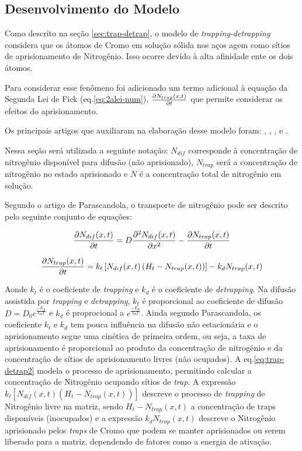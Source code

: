 \subsection{Desenvolvimento do Modelo}
\label{sec:trap-detrap-desenvolvimento}
Como descrito na seção \autoref{sec:trap-detrap}, o modelo de \textit{trapping-detrapping} considera que os átomos de Cromo em solução sólida nos aços agem como sítios de aprisionamento de Nitrogênio. Isso ocorre devido à alta afinidade ente os dois átomos.

Para considerar esse fenômeno foi adicionado um termo adicional à equação da Segunda Lei de Fick (eq.\autoref{eq:2alei-num}), $\pdv{N_{trap}(x,t)}{t}$ que permite considerar os efeitos do aprisionamento. 

Os principais artigos que auxiliaram na elaboração desse modelo foram:
\cite{moskalioviene2011modeling}, \cite{parascandola2000nitrogen}, \cite{moller1983pidat}, \cite{peng2018numerical} e \cite{moller2001surface}.  

Nessa seção será utilizada a seguinte notação: $N_{dif}$ corresponde à concentração de nitrogênio disponível para difusão (não aprisionado), $N_{trap}$ será a concentração de nitrogênio no estado aprisionado e $N$ é a concentração total de nitrogênio em solução.

Segundo o artigo de Parascandola, o transporte de nitrogênio pode ser descrito pelo seguinte conjunto de equações:

\begin{equation}
\label{eq:trap-detrap}
\pdv{N_{dif}(x,t)}{t} = D\pdv[2]{N_{dif}(x,t)}{x} - \pdv{N_{trap}(x,t)}{t} 
\end{equation}

\begin{equation}
\label{eq:trap-detrap2}
\pdv{N_{trap}(x,t)}{t} = k_t\left[N_{dif}(x,t)\left(H_t-N_{trap}(x,t)\right)\right] - k_dN_{trap}(x,t)
\end{equation}

Aonde $k_t$ é o coeficiente de \textit{trapping} e $k_d$ é o coeficiente de \textit{detrapping}. Na difusão assistida por \textit{trapping} e \textit{detrapping}, $k_t$ é proporcional ao coeficiente de difusão ${D=D_0e^{\frac{-E_A}{k_BT}}}$ e $k_d$ é proprocional a ${e^{\frac{-E_B}{k_BT}}}$. Ainda segundo Parascandola, os coeficiente $k_t$ e $k_d$ tem pouca influência na difusão não estacionária e o aprisionamento segue uma cinética de primeira ordem, ou seja, a taxa de aprisionamento é proporcional ao produto da concentração de nitrogênio e da concentração de sítios de aprisionamento livres (não ocupados). A eq.\autoref{eq:trap-detrap2} modela o processo de aprisionamento, permitindo calcular a concentração de Nitrogênio ocupando sítios de \textit{trap}. A expressão $k_t\left[N_{dif}(x,t)\left(H_t-N_{trap}(x,t)\right)\right]$ descreve o processo de \textit{trapping} de Nitrogênio livre na matriz, sendo $H_t - N_{trap}(x,t)$ a concentração de traps disponíveis (inocupados) e a expressão $ k_dN_{trap}(x,t)$ descreve o Nitrogênio aprisionado pelos \textit{traps} de Cromo que podem se manter aprisionados ou serem liberado para a matriz, dependendo de fatores como a energia de ativação.


